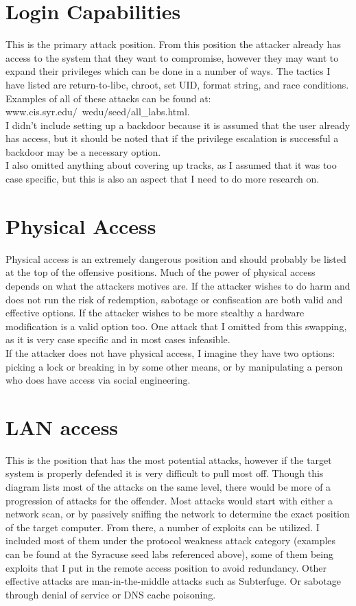 \documentclass{article}
\begin{document}
\section{Login Capabilities}

This is the primary attack position. From this position the attacker already has access to the system that they want to compromise, however they may want to expand their privileges which can be done in a number of ways. The tactics I have listed are return-to-libc, chroot, set UID, format string, and race conditions. Examples of all of these attacks can be found at: www.cis.syr.edu/~wedu/seed/all\_labs.html.\\
I didn't include setting up a backdoor because it is assumed that the user already has access, but it should be noted that if the privilege escalation is successful a backdoor may be a necessary option.\\
I also omitted anything about covering up tracks, as I assumed that it was too case specific, but this is also an aspect that I need to do more research on.\\

\section{Physical Access}
Physical access is an extremely dangerous position and should probably be listed at the top of the offensive positions. Much of the power of physical access depends on what the attackers motives are. If the attacker wishes to do harm and does not run the risk of redemption, sabotage or confiscation are both valid and effective options. If the attacker wishes to be more stealthy a hardware modification is a valid option too. One attack that I omitted from this swapping, as it is very case specific and in most cases infeasible.\\
If the attacker does not have physical access, I imagine they have two options: picking a lock or breaking in by some other means, or by manipulating a person who does have access via social engineering.\\

\section{LAN access}
This is the position that has the most potential attacks, however if the target system is properly defended it is very difficult to pull most off. Though this diagram lists most of the attacks on the same level, there would be more of a progression of attacks for the offender. Most attacks would start with either a network scan, or by passively sniffing the network to determine the exact position of the target computer. From there, a number of exploits can be utilized. I included most of them under the protocol weakness attack category (examples can be found at the Syracuse seed labs referenced above), some of them being exploits that I put in the remote access position to avoid redundancy. Other effective attacks are man-in-the-middle attacks such as Subterfuge. Or sabotage through denial of service or DNS cache poisoning.\\
\end{document}

